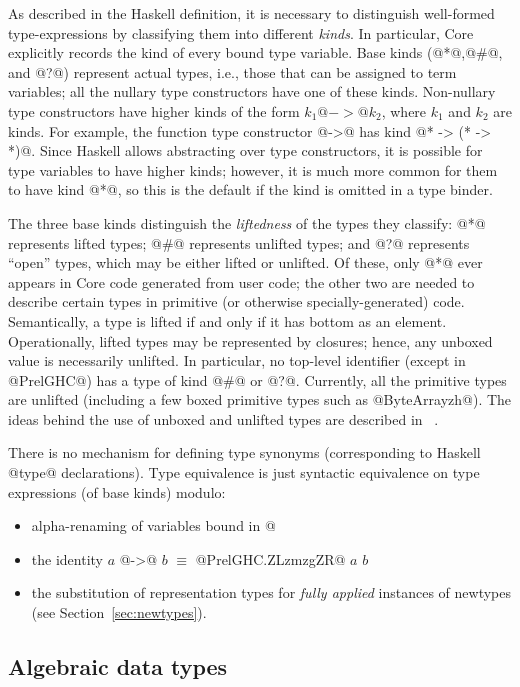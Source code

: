 \documentclass[10pt]{article}
\begin{document}
As described in the Haskell definition, it is necessary to distinguish 
well-formed type-expressions by classifying them into different {\it kinds}.
In particular, Core explicitly records the kind of every bound type variable.
Base kinds (@*@,@#@, and @?@) represent actual types, i.e., those that can be assigned
to term variables; all the nullary type constructors have one of these kinds.
Non-nullary type constructors have higher kinds of the form $k_1 @->@ k_2$,
where $k_1$ and $k_2$ are kinds.   For example, the function type constructor
@->@ has kind @* -> (* -> *)@.  Since Haskell allows abstracting over type
constructors, it is possible for type variables to have higher kinds; however,
it is much more common for them to have kind @*@, so this is the default if
the kind is omitted in a type binder.

The three base kinds distinguish the {\it liftedness} of the types they classify:
@*@ represents lifted types; @#@ represents unlifted types; and @?@ represents
``open'' types, which may be either lifted or unlifted.  Of these, only @*@ ever
appears in Core code generated from user code; the other two are needed to describe
certain types in primitive (or otherwise specially-generated) code.
Semantically, a type is lifted if and only if it has bottom as an element. 
Operationally, lifted types may be represented by closures; hence, any unboxed
value is necessarily unlifted.  
In particular, no top-level identifier (except in @PrelGHC@) has a type of kind @#@ or @?@.
Currently, all the primitive types are unlifted 
(including a few boxed primitive types such as @ByteArrayzh@).
The ideas behind the use of unboxed and unlifted types are described in ~\cite{pj:unboxed}.

There is no mechanism for defining type synonyms (corresponding to
Haskell @type@ declarations).
Type equivalence is just syntactic equivalence on type expressions
(of base kinds) modulo:

\begin{itemize} 
\item alpha-renaming of variables bound in @%
\item the identity $a$ @->@ $b$ $\equiv$ @PrelGHC.ZLzmzgZR@ $a$ $b$
\item the substitution of representation types for {\it fully applied} instances of newtypes
(see Section~\ref{sec:newtypes}).
\end{itemize}

\subsection{Algebraic data types}
\end{document}
